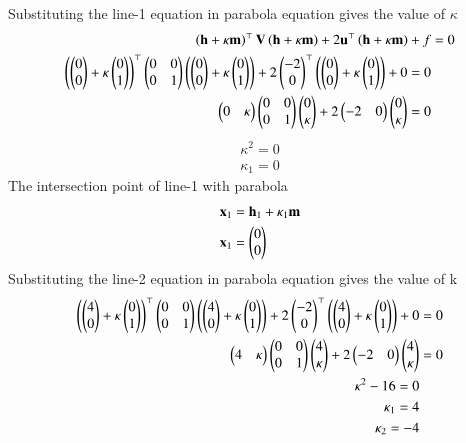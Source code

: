 \documentclass[journal]{IEEEtran}
\begin{document}
Substituting the line-1 equation in parabola equation gives the value of $\kappa$
\begin{align}
\brak{\vec{h}+\kappa\vec{m}}^\top\vec{V}\brak{\vec{h}+\kappa\vec{m}} + 2\vec{u}^\top\brak{\vec{h}+\kappa\vec{m}} + f &= 0 \\
\brak{\myvec{0 \\ 0} + \kappa \myvec{0\\1}}^\top \myvec{ 0&0\\0&1}\brak{\myvec{0 \\ 0}+ \kappa \myvec{0\\1}} + 2\myvec{-2\\0}^\top \brak{\myvec{0 \\ 0} + \kappa \myvec{0\\1}} + 0 = 0 \\
\myvec{0 & \kappa}\myvec{0 & 0 \\ 0 &1}\myvec{0 \\ \kappa} + 2\myvec{-2 & 0}\myvec{0 \\ \kappa} = 0
\end{align}
\begin{align}
    \kappa^2 = 0 \\
    \kappa_1 = 0
\end{align}
The intersection point of line-1 with parabola
\begin{align}
    \vec{x}_1 &= \vec{h}_1 + \kappa_1\vec{m}\\
    \vec{x}_1 &= \myvec{0 \\ 0}
\end{align}
Substituting the line-2 equation in parabola equation gives the value of k
\begin{align}
    \brak{\myvec{4\\0}+\kappa\myvec{0\\1}}^\top\myvec{0 & 0\\0 & 1}\brak{\myvec{4\\0}+\kappa\myvec{0\\1}} + 2\myvec{-2\\0}^\top\brak{\myvec{4\\0}+\kappa\myvec{0\\1}} + 0 &= 0\\
\myvec{4&\kappa}\myvec{0&0\\0&1}\myvec{4\\\kappa}+2\myvec{-2&0}\myvec{4\\\kappa} &= 0\\
\kappa^2 - 16 = 0 \\
\kappa_1 = 4 \\
\kappa_2 = -4
\end{align}
\end{document}
